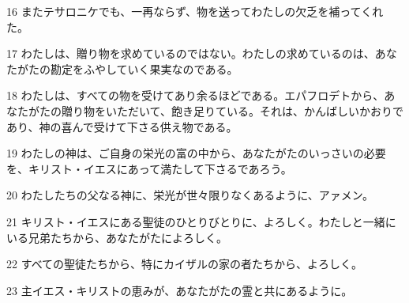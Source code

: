 \par 16 またテサロニケでも、一再ならず、物を送ってわたしの欠乏を補ってくれた。
\par 17 わたしは、贈り物を求めているのではない。わたしの求めているのは、あなたがたの勘定をふやしていく果実なのである。
\par 18 わたしは、すべての物を受けてあり余るほどである。エパフロデトから、あなたがたの贈り物をいただいて、飽き足りている。それは、かんばしいかおりであり、神の喜んで受けて下さる供え物である。
\par 19 わたしの神は、ご自身の栄光の富の中から、あなたがたのいっさいの必要を、キリスト・イエスにあって満たして下さるであろう。
\par 20 わたしたちの父なる神に、栄光が世々限りなくあるように、アァメン。
\par 21 キリスト・イエスにある聖徒のひとりびとりに、よろしく。わたしと一緒にいる兄弟たちから、あなたがたによろしく。
\par 22 すべての聖徒たちから、特にカイザルの家の者たちから、よろしく。
\par 23 主イエス・キリストの恵みが、あなたがたの霊と共にあるように。


